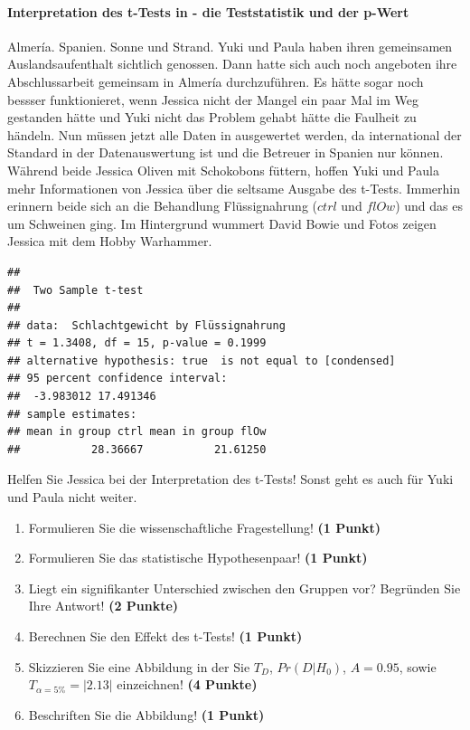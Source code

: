\documentclass[a4paper, 9pt]{scrartcl}\usepackage[]{graphicx}\usepackage[]{xcolor}
\makeatletter
\newenvironment{kframe}{%
 \def\at@end@of@kframe{}%
 \ifinner\ifhmode%
  \def\at@end@of@kframe{\end{minipage}}%
  \begin{minipage}{\columnwidth}%
 \fi\fi%
 \def\FrameCommand##1{\hskip\@totalleftmargin \hskip-\fboxsep
 \colorbox{shadecolor}{##1}\hskip-\fboxsep
     \hskip-\linewidth \hskip-\@totalleftmargin \hskip\columnwidth}%
 \MakeFramed {\advance\hsize-\width
   \@totalleftmargin\z@ \linewidth\hsize
   \@setminipage}}%
 {\par\unskip\endMakeFramed%
 \at@end@of@kframe}
\newenvironment{knitrout}{}{} %
\makeatother
\begin{document}
\ifcollection
\paragraph{Interpretation des t-Tests in \Rlogo - die Teststatistik und der p-Wert}
\fi

Almería. Spanien. Sonne und Strand. Yuki und Paula haben ihren gemeinsamen Auslandsaufenthalt sichtlich genossen. Dann hatte sich auch noch angeboten ihre Abschlussarbeit gemeinsam in Almería durchzuführen. Es hätte sogar noch bessser funktionieret, wenn Jessica nicht der Mangel ein paar Mal im Weg gestanden hätte und Yuki nicht das Problem gehabt hätte die Faulheit zu händeln. Nun müssen jetzt alle Daten in \Rlogo ausgewertet werden, da \Rlogo international der Standard in der Datenauswertung ist und die Betreuer in Spanien nur \Rlogo können. Während beide Jessica Oliven mit Schokobons füttern, hoffen Yuki und Paula mehr Informationen von Jessica über die seltsame \Rlogo Ausgabe des t-Tests. Immerhin erinnern beide sich an die Behandlung Flüssignahrung ($ctrl$ und $flOw$) und das es um Schweinen ging. Im Hintergrund wummert David Bowie und Fotos zeigen Jessica mit dem Hobby Warhammer.

\begin{knitrout}
\color{fgcolor}\begin{kframe}
\begin{verbatim}
## 
## 	Two Sample t-test
## 
## data:  Schlachtgewicht by Flüssignahrung
## t = 1.3408, df = 15, p-value = 0.1999
## alternative hypothesis: true  is not equal to [condensed]
## 95 percent confidence interval:
##  -3.983012 17.491346
## sample estimates:
## mean in group ctrl mean in group flOw 
##           28.36667           21.61250
\end{verbatim}
\end{kframe}
\end{knitrout}

Helfen Sie Jessica bei der Interpretation des t-Tests! Sonst geht es auch für Yuki und Paula nicht weiter.
  
\begin{enumerate}
  \item Formulieren Sie die wissenschaftliche Fragestellung! \textbf{(1 Punkt)}
  \item Formulieren Sie das statistische Hypothesenpaar! \textbf{(1 Punkt)}
\item Liegt ein signifikanter Unterschied zwischen den Gruppen vor? Begründen Sie Ihre Antwort! \textbf{(2 Punkte)}
\item Berechnen Sie den Effekt des t-Tests! \textbf{(1 Punkt)}
\item Skizzieren Sie eine Abbildung in der Sie $T_{D}$, $Pr(D|H_0)$, $A=0.95$, sowie $T_{\alpha=5\%} = |2.13|$ einzeichnen! \textbf{(4 Punkte)}
\item Beschriften Sie die Abbildung! \textbf{(1 Punkt)}  
\end{enumerate} 
\clearpage
\end{document}
